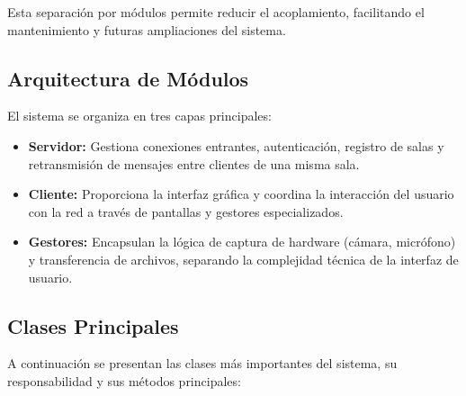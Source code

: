 \documentclass[12pt,a4paper]{article}
\begin{document}
Esta separaci\'on por m\'odulos permite reducir el acoplamiento, facilitando el mantenimiento y futuras ampliaciones del sistema.

\subsection{Arquitectura de M\'odulos}

El sistema se organiza en tres capas principales:

\begin{itemize}
    \item \textbf{Servidor:} Gestiona conexiones entrantes, autenticaci\'on, registro de salas y retransmisi\'on de mensajes entre clientes de una misma sala.
    \item \textbf{Cliente:} Proporciona la interfaz gr\'afica y coordina la interacci\'on del usuario con la red a trav\'es de pantallas y gestores especializados.
    \item \textbf{Gestores:} Encapsulan la l\'ogica de captura de hardware (c\'amara, micr\'ofono) y transferencia de archivos, separando la complejidad t\'ecnica de la interfaz de usuario.
\end{itemize}

\subsection{Clases Principales}

A continuaci\'on se presentan las clases m\'as importantes del sistema, su responsabilidad y sus m\'etodos principales:
\end{document}
